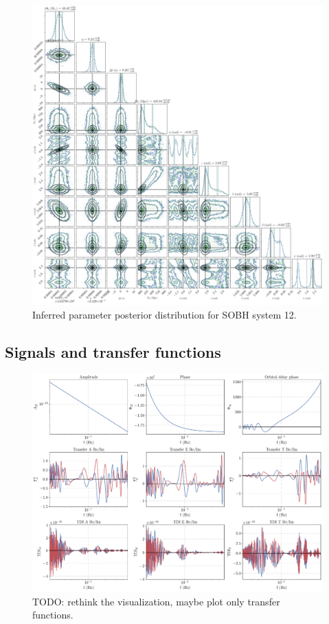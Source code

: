 \documentclass[aps,showpacs,twocolumn,prd,superscriptaddress,nofootinbib]{revtex4-1}
\newcommand{\SM}[1]{{\color{Blue} #1}}
\begin{document}
\begin{figure}
	\includegraphics[width=\textwidth]{../plots/corner_sobh_tdc2_ptmcmc_bambi}
	\caption{Inferred parameter posterior distribution for SOBH system 12.}
	\label{fig:sobh_corner_12}
\end{figure}


\subsection{Signals and transfer functions}
\label{subsec:signaltransferSOBH}

\begin{figure}
  \centering
  \includegraphics[width=.98\linewidth]{../plots/plot_sobh1_alltdi.pdf}
  \caption{\SM{TODO: rethink the visualization, maybe plot only transfer functions}.}
  \label{fig:PEsmbh22hmCase0}
\end{figure}
\end{document}
